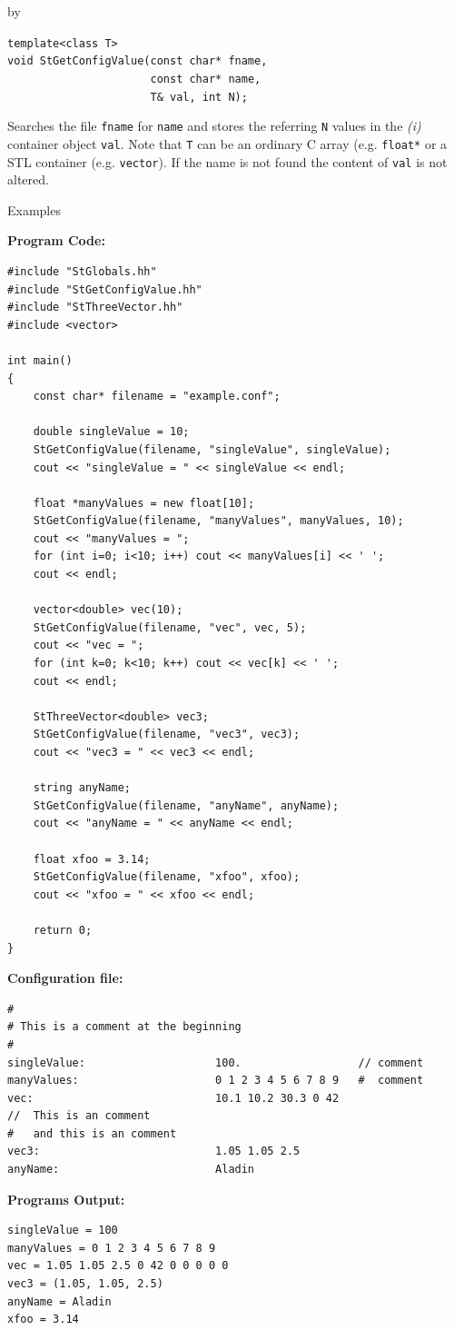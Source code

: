 \documentclass[twoside]{article}
\newcommand{\comp}[1]{\texttt{#1}}%
\newcommand{\entrylabel}[1]{\mbox{\textbf{{#1}}}\hfil}%
\newenvironment{entry}
{\begin{list}{}%
    {\renewcommand{\makelabel}{\entrylabel}%
     \setlength{\labelwidth}{90pt}%
     \setlength{\leftmargin}{\labelwidth}
     \advance\leftmargin by \labelsep%
      }%
    }%
  {\end{list}}
\newcommand{\Entrylabel}[1]%
{\raisebox{0pt}[1ex][0pt]{\makebox[\labelwidth][l]%
    {\parbox[t]{\labelwidth}{\hspace{0pt}\textbf{{#1}}}}}}
\newenvironment{Entry}%
{\renewcommand{\entrylabel}{\Entrylabel}\begin{entry}}%
  {\end{entry}}
\begin{document}
\begin{description}
\begin{Entry}
    \verb+template<class T>+\\
    \verb+void StGetConfigValue(const char* fname,+\\
    \verb+                      const char* name,+\\
    \verb+                      T& val, int N);+
    
    Searches the file \comp{fname} for \comp{name} and stores
    the referring \comp{N} values in the {\em (i)} container object \comp{val}.
    Note that \comp{T} can be an ordinary C array (e.g. \comp{float*} or a
    STL container
    (e.g. \comp{vector}).
    If the name is not found the content of \comp{val} is not altered.

\item[Examples]
{\footnotesize
{\bf Program Code:}  
\begin{verbatim}
#include "StGlobals.hh"
#include "StGetConfigValue.hh"
#include "StThreeVector.hh"
#include <vector>

int main()
{
    const char* filename = "example.conf";

    double singleValue = 10;
    StGetConfigValue(filename, "singleValue", singleValue);
    cout << "singleValue = " << singleValue << endl;

    float *manyValues = new float[10];
    StGetConfigValue(filename, "manyValues", manyValues, 10);
    cout << "manyValues = ";
    for (int i=0; i<10; i++) cout << manyValues[i] << ' ';
    cout << endl;

    vector<double> vec(10);
    StGetConfigValue(filename, "vec", vec, 5);
    cout << "vec = ";
    for (int k=0; k<10; k++) cout << vec[k] << ' ';
    cout << endl;

    StThreeVector<double> vec3;
    StGetConfigValue(filename, "vec3", vec3);
    cout << "vec3 = " << vec3 << endl;
    
    string anyName;
    StGetConfigValue(filename, "anyName", anyName);
    cout << "anyName = " << anyName << endl;
    
    float xfoo = 3.14;
    StGetConfigValue(filename, "xfoo", xfoo);
    cout << "xfoo = " << xfoo << endl;

    return 0;
}
\end{verbatim}
{\bf Configuration file:}  
\begin{verbatim}
#
# This is a comment at the beginning
#
singleValue:                    100.                  // comment
manyValues:                     0 1 2 3 4 5 6 7 8 9   #  comment
vec:                            10.1 10.2 30.3 0 42
//  This is an comment
#   and this is an comment
vec3:                           1.05 1.05 2.5
anyName:                        Aladin
\end{verbatim}
{\bf Programs Output:}
\begin{verbatim}
singleValue = 100
manyValues = 0 1 2 3 4 5 6 7 8 9 
vec = 1.05 1.05 2.5 0 42 0 0 0 0 0 
vec3 = (1.05, 1.05, 2.5)
anyName = Aladin
xfoo = 3.14
\end{verbatim}
}   
\end{Entry}
\clearpage


\end{description}
\end{document}
